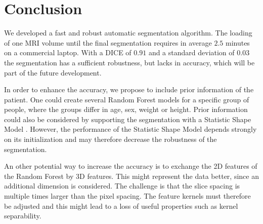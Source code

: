 \section{Conclusion}
We developed a fast and robust automatic segmentation algorithm. The loading of one MRI volume until the final segmentation requires in average $2.5$ minutes on a commercial laptop. With a DICE of $0.91$ and a standard deviation of $0.03$ the segmentation has a sufficient robustness, but lacks in accuracy, which will be part of the future development.

In order to enhance the accuracy, we propose to include prior information of the patient. One could create several Random Forest models for a specific group of people, where the groups differ in age, sex, weight or height. Prior information could also be considered by supporting the segmentation with a Statistic Shape Model \cite{heimann2009statistical}. However, the performance of the Statistic Shape Model depends strongly on its initialization and may therefore decrease the robustness of the segmentation.

An other potential way to increase the accuracy is to exchange the 2D features of the Random Forest by 3D features. This might represent the data better, since an additional dimension is considered. The challenge is that the slice spacing is multiple times larger than the pixel spacing. The feature kernels must therefore be adjusted and this might lead to a loss of useful properties such as kernel separability.
